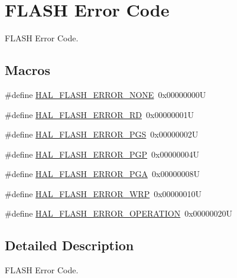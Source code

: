 \hypertarget{group___f_l_a_s_h___error___code}{}\section{F\+L\+A\+SH Error Code}
\label{group___f_l_a_s_h___error___code}


F\+L\+A\+SH Error Code.  


\subsection*{Macros}
\begin{DoxyCompactItemize}
\item 
\#define \hyperlink{group___f_l_a_s_h___error___code_gae7fb9ee7198d393aba27ade3a9f50a70}{H\+A\+L\+\_\+\+F\+L\+A\+S\+H\+\_\+\+E\+R\+R\+O\+R\+\_\+\+N\+O\+NE}~0x00000000U
\item 
\#define \hyperlink{group___f_l_a_s_h___error___code_ga33008f2ad5085cd4158dd260fb2d124d}{H\+A\+L\+\_\+\+F\+L\+A\+S\+H\+\_\+\+E\+R\+R\+O\+R\+\_\+\+RD}~0x00000001U
\item 
\#define \hyperlink{group___f_l_a_s_h___error___code_ga7132ff3b7f45c0cfe818d61bdb01dc64}{H\+A\+L\+\_\+\+F\+L\+A\+S\+H\+\_\+\+E\+R\+R\+O\+R\+\_\+\+P\+GS}~0x00000002U
\item 
\#define \hyperlink{group___f_l_a_s_h___error___code_ga4c79d30899d81069a5a7d36c9a008114}{H\+A\+L\+\_\+\+F\+L\+A\+S\+H\+\_\+\+E\+R\+R\+O\+R\+\_\+\+P\+GP}~0x00000004U
\item 
\#define \hyperlink{group___f_l_a_s_h___error___code_gad9f62b6567543610f667bce580550662}{H\+A\+L\+\_\+\+F\+L\+A\+S\+H\+\_\+\+E\+R\+R\+O\+R\+\_\+\+P\+GA}~0x00000008U
\item 
\#define \hyperlink{group___f_l_a_s_h___error___code_ga27e871d85f9311272098315bc3723075}{H\+A\+L\+\_\+\+F\+L\+A\+S\+H\+\_\+\+E\+R\+R\+O\+R\+\_\+\+W\+RP}~0x00000010U
\item 
\#define \hyperlink{group___f_l_a_s_h___error___code_gafa1433e0ca2366478928c04244310d44}{H\+A\+L\+\_\+\+F\+L\+A\+S\+H\+\_\+\+E\+R\+R\+O\+R\+\_\+\+O\+P\+E\+R\+A\+T\+I\+ON}~0x00000020U
\end{DoxyCompactItemize}


\subsection{Detailed Description}
F\+L\+A\+SH Error Code. 



